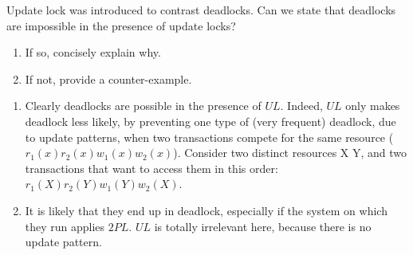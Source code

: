 \documentclass[12pt, a4paper]{report}
\newtheorem[style=M,bodystyle=\normalfont]{theorem}{Theorem}
\newtheorem[style=M,bodystyle=\normalfont]{corollary}{Corollary}
\newtheorem[style=M,bodystyle=\normalfont]{lemma}{Lemma}
\newtheorem[style=M,bodystyle=\normalfont]{definition}{Definition}
\begin{document}
    \newpage

    \begin{Exercise}[label=1]
        Update lock was introduced to contrast deadlocks. Can we state that deadlocks are impossible in the presence of update locks?
        \begin{enumerate}
            \item If so, concisely explain why. 
            \item If not, provide a counter-example.
        \end{enumerate}
    \end{Exercise}
    \begin{Answer}[ref=1]
        \begin{enumerate}
            \item Clearly deadlocks are possible in the presence of $UL$. Indeed, $UL$ only makes deadlock less likely, by preventing one type of (very frequent) deadlock, due to 
                update patterns, when two transactions compete for the same resource ($r_1(x) r_2(x) w_1(x) w_2(x)$). Consider two distinct resources X Y, and two transactions that 
                want to access them in this order: $r_1(X) r_2(Y) w_1(Y) w_2(X)$.
            \item It is likely that they end up in deadlock, especially if the system on which they run applies $2PL$. $UL$ is totally irrelevant here, because there is no update 
                pattern. 
        \end{enumerate}
    \end{Answer}
\end{document}
